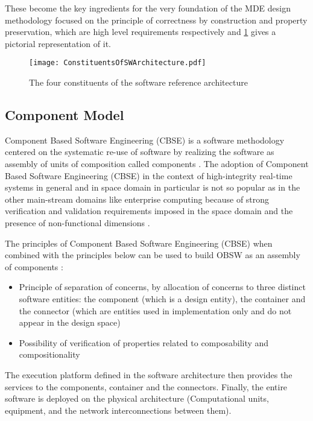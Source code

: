These become the key ingredients for the very foundation of the MDE design methodology focused on the principle of correctness by construction and property preservation, which are high level requirements respectively and \cref{fig: Constituents of OSRA} gives a pictorial representation of it.

\begin{figure}[h]
	\centering
	\texttt{[image: ConstituentsOfSWArchitecture.pdf]}
	\caption{The four constituents of the software reference architecture}
	\label{fig: Constituents of OSRA}
\end{figure}

\subsection{Component Model}
Component Based Software Engineering (CBSE) is a software methodology centered on the systematic re-use of software by realizing the software as assembly of units of composition called components \cite{CBSE}.
The adoption of Component Based Software Engineering (CBSE) in the context of high-integrity real-time systems in general and in space domain in particular is not so popular as in the other main-stream domains like enterprise computing \cite{SAVOIR} because of strong verification and validation requirements imposed in the space domain and the presence of non-functional dimensions \cite{SAVOIR}.

The principles of Component Based Software Engineering (CBSE) when combined with the principles below can be used to build OBSW as an assembly of components \cite{SAVOIR}: 
\begin{itemize}
\item Principle of separation of concerns, by allocation of concerns to three distinct software entities: the component (which is a design entity), the container and the connector (which are entities used in implementation only and do not appear in the design space)
\item Possibility of verification of properties related to composability and compositionality \cite{CompBasedDev} 
\end{itemize}

The execution platform defined in the software architecture then provides the services to the components, container and the connectors. Finally, the entire software is deployed on the physical architecture (Computational units, equipment, and the network interconnections between them).

